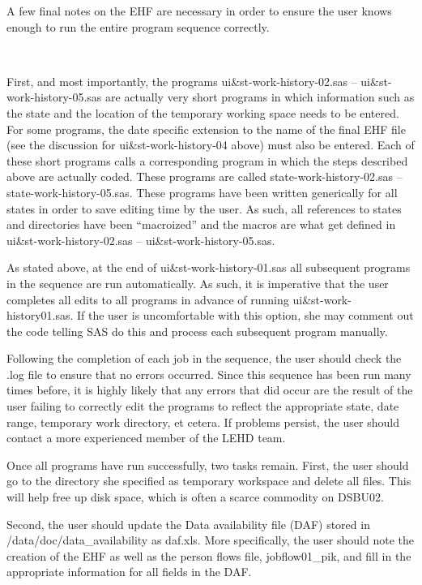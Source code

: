 A few final notes on the EHF are necessary in order to ensure the user knows 
enough to run the entire program sequence correctly. 
\begin{description}
\item \ 


  \begin{notes}
\item 
First, and most 
importantly, the programs ui{\&}st-work-history-02.sas -- 
ui{\&}st-work-history-05.sas are actually very short programs in which 
information such as the state and the location of the temporary working 
space needs to be entered. For some programs, the date specific extension to 
the name of the final EHF file (see the discussion for 
ui{\&}st-work-history-04 above) must also be entered. Each of these short 
programs calls a corresponding program in which the steps described above are actually 
coded. These programs are called state-work-history-02.sas --
state-work-history-05.sas. 
These programs have been written generically for all states in order 
to save editing time by the user. As such, all references to states and 
directories have been ``macroized'' and the macros are what get defined in 
ui{\&}st-work-history-02.sas -- ui{\&}st-work-history-05.sas. 

\item 
As stated above, at the end of ui{\&}st-work-history-01.sas all subsequent 
programs in the sequence are run automatically. As such, it is imperative 
that the user completes all edits to all programs in advance of running 
ui{\&}st-work-history01.sas. If the user is uncomfortable with this option, 
she may comment out the code telling SAS do this and process each subsequent 
program manually.

\item 
Following the completion of each job in the sequence, the user should check 
the .log file to ensure that no errors occurred. Since this sequence has 
been run many times before, it is highly likely that any errors that did 
occur are the result of the user failing to correctly edit the programs to 
reflect the appropriate state, date range, temporary work directory, et 
cetera. If problems persist, the user should contact a more experienced 
member of the LEHD team. 

\item

Once all programs have run successfully, two tasks remain. First, the user 
should go to the directory she specified as temporary workspace and delete 
all files. This will help free up disk space, which is often a scarce 
commodity on DSBU02. 

\item Second, the user should update the Data availability 
file (DAF) stored in /data/doc/data{\_}availability as daf.xls. More specifically, 
the user should note the creation of the EHF as well as the person flows 
file, jobflow01{\_}pik, and fill in the appropriate information for all 
fields in the DAF.
\end{notes}

\end{description}


